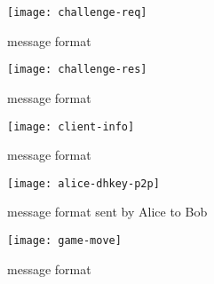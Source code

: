 \begin{figure}[htb]
	\texttt{[image: challenge-req]}
	\caption{ message format}\label{fig:challenge-req}
\end{figure}

\begin{figure}[htb]
	\texttt{[image: challenge-res]}
	\caption{ message format}\label{fig:challenge-res}
\end{figure}

\begin{figure}[htb]
	\texttt{[image: client-info]}
	\caption{ message format}\label{fig:client-info}
\end{figure}

\begin{figure}[htb]
	\texttt{[image: alice-dhkey-p2p]}
	\caption{ message format sent by Alice to Bob}\label{fig:alice-dhkey-p2p}
\end{figure}

\begin{figure}[htb]
	\texttt{[image: game-move]}
	\caption{ message format}\label{fig:game-move}
\end{figure}

